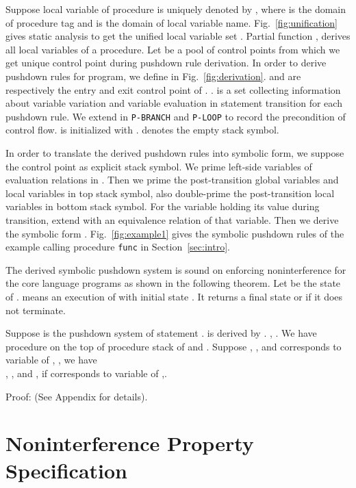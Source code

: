 \documentclass{llncs}
\begin{document}
Suppose local variable  of procedure  is uniquely denoted by
, where
 is the domain of procedure tag and  is the
domain of local variable name. Fig.~\ref{fig:unification} gives
static analysis  to get the unified local variable set
. Partial function
, derives all local variables of a
procedure. Let  be a pool of
control points from which we get unique control point during
pushdown rule derivation. In order to derive pushdown rules for
program, we define  in
Fig.~\ref{fig:derivation}.  and  are respectively the
entry and exit control point of . .  is a set
collecting information about variable variation and variable
evaluation in statement transition for each pushdown rule. We extend
 in \texttt{P-BRANCH} and \texttt{P-LOOP} to record the
precondition of control flow.  is initialized with .
 denotes the empty stack symbol.

In order to translate the derived pushdown rules into symbolic form,
we suppose the control point as explicit stack symbol. We prime
left-side variables of evaluation relations in . Then we prime
the post-transition global variables and local variables in top
stack symbol, also double-prime the post-transition local variables
in bottom stack symbol. For the variable holding its value during
transition, extend  with an equivalence relation of that
variable. Then we derive the symbolic form . Fig.~\ref{fig:example1} gives the symbolic pushdown
rules of the example calling procedure \texttt{func} in
Section~\ref{sec:intro}.

The derived symbolic pushdown system is sound on enforcing
noninterference for the core language programs as shown in the
following theorem. Let  be the
state of . 
means an execution of  with initial state . It
returns a final state  or  if it does not terminate.

\begin{theorem} Suppose
 is the pushdown system of statement
.  is derived by .
,
. We have procedure
 on the top of procedure stack of  and .
Suppose , , and  corresponds to variable  of , , we have\\
, , and , if  corresponds to variable  of
,.
\end{theorem}
Proof: (See Appendix for details).

\section{\label{sec:prop_spec}Noninterference Property Specification}
\end{document}
